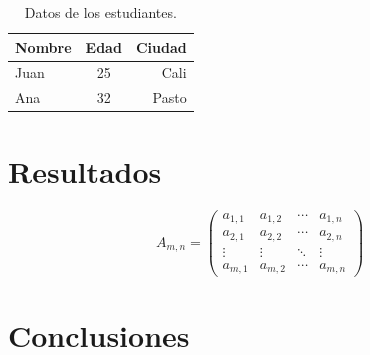 \documentclass{article}
\begin{document}
  \begin{table}[h]
    \centering
    \begin{tabular}{|l||cr|}
      \hline
      Nombre & Edad & Ciudad\\
      \hline
      Juan & 25 & Cali\\
      Ana & 32 & Pasto\\
      \hline
    \end{tabular}
    \caption{Datos de los estudiantes.}
    \label{tab:estudiantes}
  \end{table}
  \lipsum[3]


  \section{Resultados}
  \lipsum[1] \cite{9372789}

  \begin{equation*}
    A_{m,n} = 
    \begin{pmatrix}
      a_{1,1} & a_{1,2} & \cdots & a_{1,n} \\
      a_{2,1} & a_{2,2} & \cdots & a_{2,n} \\
      \vdots  & \vdots  & \ddots & \vdots  \\
      a_{m,1} & a_{m,2} & \cdots & a_{m,n} 
    \end{pmatrix}
  \end{equation*}

  \lipsum[3-4] \cite{9372789}
  
  \section{Conclusiones}
  \lipsum[1-4]
 
  \printbibliography
\end{document}
